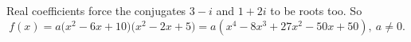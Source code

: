 Real coefficients force the conjugates $3-i$ and $1+2i$ to be roots too. So
\[f(x)=a\bigl(x^2-6x+10\bigr)\bigl(x^2-2x+5\bigr)=\boxed{a\left(x^4-8x^3+27x^2-50x+50\right)},\ a\ne0.\]
